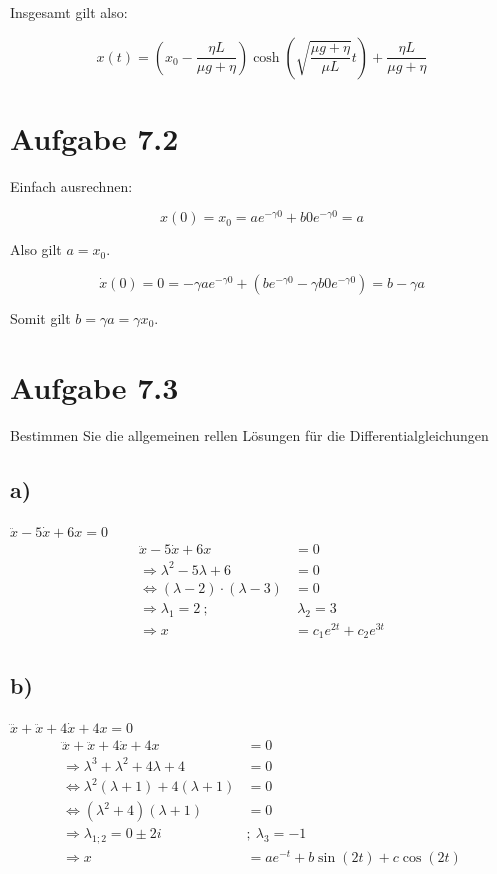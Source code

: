 \documentclass{theozettel}
\begin{document}
Insgesamt gilt also:

$$
x(t) = (x_0 - \frac{\eta L}{\mu g + \eta}) \cosh(\sqrt{\frac{\mu g + \eta}{\mu L}} t ) + \frac{\eta L}{\mu g + \eta}
$$


\section*{Aufgabe 7.2} 


Einfach ausrechnen:

$$
x(0) = x_0 = a e^{- \gamma 0} + b 0 e^{- \gamma 0} = a
$$

Also gilt $a = x_0$.

$$
\dot{x}(0) = 0 = - \gamma a e^{- \gamma 0} + (b e^{- \gamma 0} - \gamma b 0 e^{- \gamma 0}) = b - \gamma a
$$

Somit gilt $b = \gamma a = \gamma x_0$.



\section*{Aufgabe 7.3} 
Bestimmen Sie die allgemeinen rellen Lösungen für die Differentialgleichungen
\subsection*{a)} $\ddot{x}-5\dot{x}+6x=0$
\begin{align*}
\ddot{x}-5\dot{x}+6x&=0\\
\Rightarrow\lambda^2-5\lambda+6&=0\\
\Leftrightarrow\left(\lambda-2\right)\cdot\left(\lambda-3\right)&=0\\
\Rightarrow\lambda_1=2 \ ;& \ \lambda_2=3\\
\Rightarrow x&=c_1e^{2t}+c_2e^{3t}
\end{align*}
\subsection*{b)}$\dddot{x}+\ddot{x}+4\dot{x}+4x=0$
\begin{align*}
\dddot{x}+\ddot{x}+4\dot{x}+4x&=0\\
\Rightarrow \lambda^3+\lambda^2+4\lambda+4&=0\\
\Leftrightarrow \lambda^2\left(\lambda+1\right)+4\left(\lambda+1\right)&=0\\
\Leftrightarrow\left(\lambda^2+4\right)\left(\lambda+1\right)&=0\\
\Rightarrow \lambda_{1;2}=0\pm 2i \ &; \ \lambda_3=-1\\
\Rightarrow x&=ae^{-t}+b\sin\left(2t\right)+c\cos\left(2t\right)
\end{align*}
\end{document}
